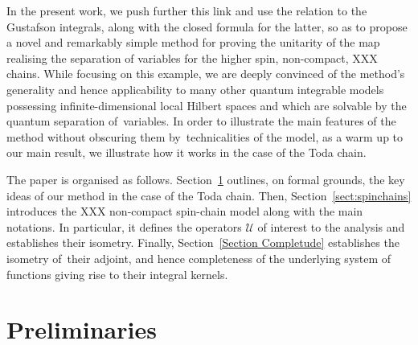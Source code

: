\documentclass[pdftex]{sigma}%
\numberwithin{equation}{section}
\begin{document}
In the present work, we push further this link and use the relation to the Gustafson integrals, along with the closed formula for the
latter, so as to propose a novel and remarkably simple method for proving the unitarity of the map realising the separation of variables
for the higher spin, non-compact, XXX chains. While focusing on this example, we are deeply convinced of the method's generality and hence
applicability to many other quantum integrable models possessing infinite-dimensional local Hilbert spaces and which are solvable by the
quantum separation of~variables. In order to illustrate the main features of the method without obscuring them by~technicalities of the
model, as a warm up to our main result, we illustrate how it works in the case of the Toda chain.


The paper is organised as follows. Section~\ref{Section Toda chain} outlines, on formal grounds, the key ideas of our method in the case of
the Toda chain. Then, Section~\ref{sect:spinchains} introduces the XXX non-compact spin-chain model along with the main notations. In
particular, it defines the operators $\mathcal{U}$ of interest to the analysis and establishes their isometry. Finally, Section~\ref{Section Completude} establishes the isometry of~their adjoint, and hence completeness of the underlying system of functions giving
rise to their integral kernels.








\section{Preliminaries} \label{Section Toda chain}
\end{document}
